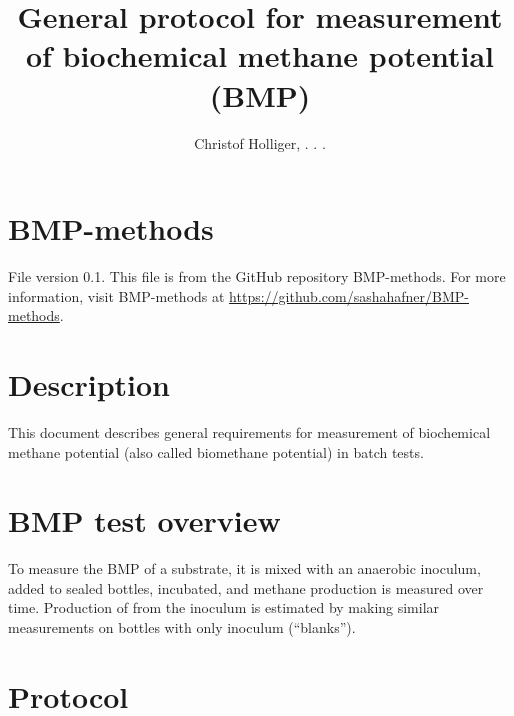\documentclass[]{article}
\title {General protocol for measurement of biochemical methane potential (BMP)}
\author{Christof Holliger, . . .  }
\begin{document}
\maketitle

\section{BMP-methods}
File version 0.1. 
This file is from the GitHub repository BMP-methods.
For more information, visit BMP-methods at \url{https://github.com/sashahafner/BMP-methods}.

\section{Description}
This document describes general requirements for measurement of biochemical methane potential (also called biomethane potential) in batch tests.

\section{BMP test overview}
To measure the BMP of a substrate, it is mixed with an anaerobic inoculum, added to sealed bottles, incubated, and methane  production is measured over time.
Production of  from the inoculum is estimated by making similar measurements on bottles with only inoculum (``blanks'').

\section{Protocol}
\end{document}

